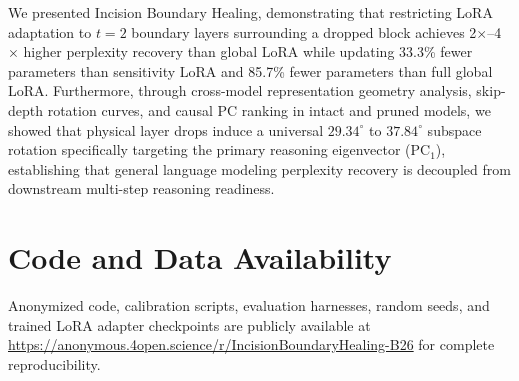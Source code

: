 \documentclass[11pt]{article}
\begin{document}
We presented Incision Boundary Healing, demonstrating that restricting LoRA adaptation to $t=2$ boundary layers surrounding a dropped block achieves 2$\times$--4$\times$ higher perplexity recovery than global LoRA while updating 33.3\% fewer parameters than sensitivity LoRA and 85.7\% fewer parameters than full global LoRA. Furthermore, through cross-model representation geometry analysis, skip-depth rotation curves, and causal PC ranking in intact and pruned models, we showed that physical layer drops induce a universal $29.34^\circ$ to $37.84^\circ$ subspace rotation specifically targeting the primary reasoning eigenvector ($\mathrm{PC}_1$), establishing that general language modeling perplexity recovery is decoupled from downstream multi-step reasoning readiness.

\section*{Code and Data Availability}
Anonymized code, calibration scripts, evaluation harnesses, random seeds, and trained LoRA adapter checkpoints are publicly available at \url{https://anonymous.4open.science/r/IncisionBoundaryHealing-B26} for complete reproducibility.


\end{document}
